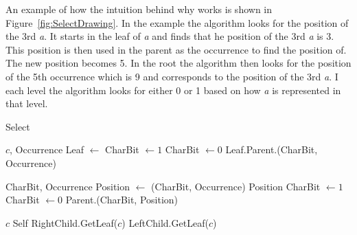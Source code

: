 An example of how the intuition behind why  works is shown in Figure~\ref{fig:SelectDrawing}.
In the example the algorithm looks for the position of the 3rd \textit{a}.
It starts in the leaf of \textit{a} and finds that he position of the 3rd \textit{a} is 3. 
This position is then used in the parent as the occurrence to find the position of. 
The new position becomes 5.
In the root the algorithm then looks for the position of the 5th occurrence which is 9 and corresponds to the position of the 3rd \textit{a}.
I each level the algorithm looks for either 0 or 1 based on how \textit{a} is represented in that level.

\begin{algorithm}
\caption{Select}
\label{alg:select}
\begin{algorithmic} 
 {$c$, Occurrence}
\State Leaf $\gets$ 
	\State CharBit $\gets 1$
\Else
	\State CharBit $\gets 0$
\EndIf
\State \Return Leaf.Parent.(CharBit, Occurrence)
\EndFunction

\vspace{5mm}

 {CharBit, Occurrence}
\State Position $\gets$ (CharBit, Occurrence)
	\State \Return Position
\EndIf
{}
	\State CharBit $\gets 1$
\Else
	\State CharBit $\gets 0$
\EndIf
\State \Return Parent.(CharBit, Position)
\EndFunction

\vspace{5mm}

 {$c$}
	\State \Return Self
\EndIf
{}
	\State \Return RightChild.GetLeaf($c$)
\Else
	\State \Return LeftChild.GetLeaf($c$)
\EndIf
\EndFunction
\end{algorithmic}
\end{algorithm}


